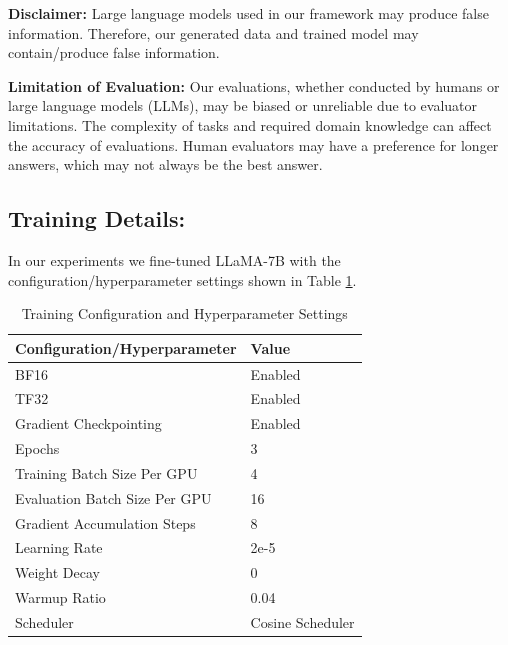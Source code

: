 \textbf{Disclaimer: }Large language models used in our framework may produce false information. Therefore, our generated data and trained model may contain/produce false information.

\textbf{Limitation of Evaluation:} Our evaluations, whether conducted by humans or large language models (LLMs), may be biased or unreliable due to evaluator limitations. The complexity of tasks and required domain knowledge can affect the accuracy of evaluations. Human evaluators may have a preference for longer answers, which may not always be the best answer.

\subsection{Training Details:}

In our experiments we fine-tuned LLaMA-7B with the configuration/hyperparameter settings shown in Table \ref{tab:configurations}.


\begin{table}[htbp]
	\centering
	\caption{Training Configuration and Hyperparameter Settings}
	\begin{tabular}{ll}
		\toprule
		\textbf{Configuration/Hyperparameter} & \textbf{Value}   \\
		\midrule
		BF16                                  & Enabled          \\
		TF32                                  & Enabled          \\
		Gradient Checkpointing                & Enabled          \\
		Epochs                                & 3                \\
		Training Batch Size Per GPU           & 4                \\
		Evaluation Batch Size Per GPU         & 16               \\
		Gradient Accumulation Steps           & 8                \\
		Learning Rate                         & 2e-5             \\
		Weight Decay                          & 0                \\
		Warmup Ratio                          & 0.04             \\
		Scheduler                             & Cosine Scheduler \\
		\bottomrule
	\end{tabular}
	\label{tab:configurations}
\end{table}


